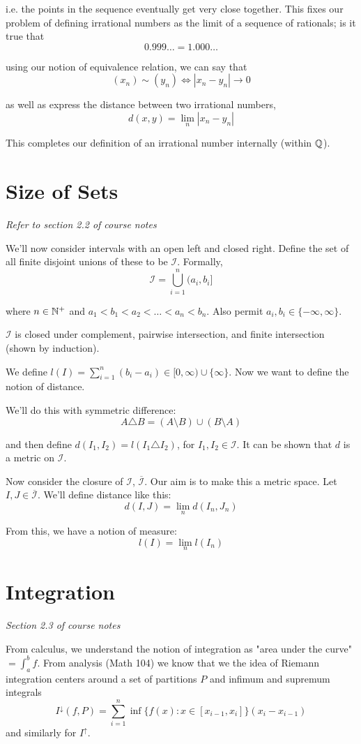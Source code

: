 \documentclass[11pt]{article}
\begin{document}
i.e. the points in the sequence eventually get very close together. This fixes our problem of defining irrational numbers as the limit of a sequence of rationals; is it true that
\[0.999\ldots = 1.000\ldots\]

using our notion of equivalence relation, we can say that
\[(x_n) \sim (y_n) \iff |x_n - y_n| \to 0\]

as well as express the distance between two irrational numbers,
\[d(x, y) = \lim_n|x_n - y_n|\]

This completes our definition of an irrational number internally (within $\mathbb{Q}$).

\section{Size of Sets}
\textit{Refer to section 2.2 of course notes}

We'll now consider intervals with an open left and closed right. Define the set of all finite disjoint unions of these to be $\mathcal{I}$. Formally,
\[\mathcal{I} = \bigcup_{i=1}^n (a_i, b_i]\]

where $n \in \mathbb{N}^+$ and $a_1 < b_1 < a_2 < \ldots < a_n < b_n$. Also permit $a_i, b_i \in \{-\infty, \infty\}$.

$\mathcal{I}$ is closed under complement, pairwise intersection, and finite intersection (shown by induction).

We define $l(I) = \sum_{i=1}^n (b_i - a_i) \in [0, \infty) \cup \{\infty\}$. Now we want to define the notion of distance.

We'll do this with symmetric difference:
\[A \triangle B = (A \setminus B) \cup (B \setminus A)\]

and then define $d(I_1, I_2) = l(I_1 \triangle I_2)$, for $I_1, I_2 \in \mathcal{I}$. It can be shown that $d$ is a metric on $\mathcal{I}$.

Now consider the closure of $\mathcal{I}$, $\overline{\mathcal{I}}$. Our aim is to make this a metric space. Let $I, J \in \overline{\mathcal{I}}$. We'll define distance like this:
\[d(I, J) = \lim_n d(I_n, J_n)\]

From this, we have a notion of measure:
\[l(I) = \lim_n l(I_n)\]

\section{Integration}
\textit{Section 2.3 of course notes}

From calculus, we understand the notion of integration as "area under the curve" $= \int_a^b f$. From analysis (Math 104) we know that we the idea of Riemann integration centers around a set of partitions $P$ and infimum and supremum integrals 
\[I^{\downarrow}(f,P) = \sum_{i=1}^n \inf\{f(x) : x \in [x_{i-1}, x_i]\}(x_i - x_{i-1})\]
and similarly for $I^{\uparrow}$.
\end{document}
